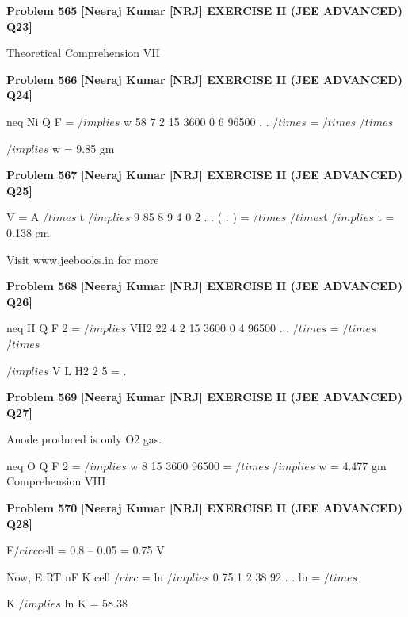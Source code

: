 \begin{problembox}
\textbf{Problem 565} \hfill \textbf{[Neeraj Kumar [NRJ] EXERCISE II (JEE ADVANCED) Q23]}
\label{q:ext-nrj_all_questions-565}

Theoretical
Comprehension VII
\end{problembox}

\begin{problembox}
\textbf{Problem 566} \hfill \textbf{[Neeraj Kumar [NRJ] EXERCISE II (JEE ADVANCED) Q24]}
\label{q:ext-nrj_all_questions-566}

neq Ni
Q
F
=
 $/implies$ w
58 7
2
15
3600
0 6
96500
.
.
$/times$
=
$/times$
$/times$
 
 
 $/implies$ w = 9.85 gm
\end{problembox}

\begin{problembox}
\textbf{Problem 567} \hfill \textbf{[Neeraj Kumar [NRJ] EXERCISE II (JEE ADVANCED) Q25]}
\label{q:ext-nrj_all_questions-567}

V = A $/times$ t $/implies$ 9 85
8 9
4 0
2
.
.
( .
)
=
$/times$
$/times$t $/implies$ t = 0.138 cm
 
 
Visit www.jeebooks.in for more
\end{problembox}

\begin{problembox}
\textbf{Problem 568} \hfill \textbf{[Neeraj Kumar [NRJ] EXERCISE II (JEE ADVANCED) Q26]}
\label{q:ext-nrj_all_questions-568}

neq H
Q
F
2 =
 $/implies$ 
VH2
22 4
2
15
3600
0 4
96500
.
.
$/times$
=
$/times$
$/times$
 
 
 $/implies$ V
L
H2
2 5
= .
\end{problembox}

\begin{problembox}
\textbf{Problem 569} \hfill \textbf{[Neeraj Kumar [NRJ] EXERCISE II (JEE ADVANCED) Q27]}
\label{q:ext-nrj_all_questions-569}

Anode produced is only O2 gas.
 
 
neq O
Q
F
2 =
 $/implies$ w
8
15
3600
96500
=
$/times$
 $/implies$ w = 4.477 gm
Comprehension VIII
\end{problembox}

\begin{problembox}
\textbf{Problem 570} \hfill \textbf{[Neeraj Kumar [NRJ] EXERCISE II (JEE ADVANCED) Q28]}
\label{q:ext-nrj_all_questions-570}

E$/circ$cell = 0.8 -- 0.05 = 0.75 V
 
 Now, E
RT
nF
K
cell
$/circ$
=
 ln
 $/implies$ 0 75
1
2
38 92
.
.
ln
=
$/times$
 
K 
$/implies$ ln K = 58.38
\end{problembox}

